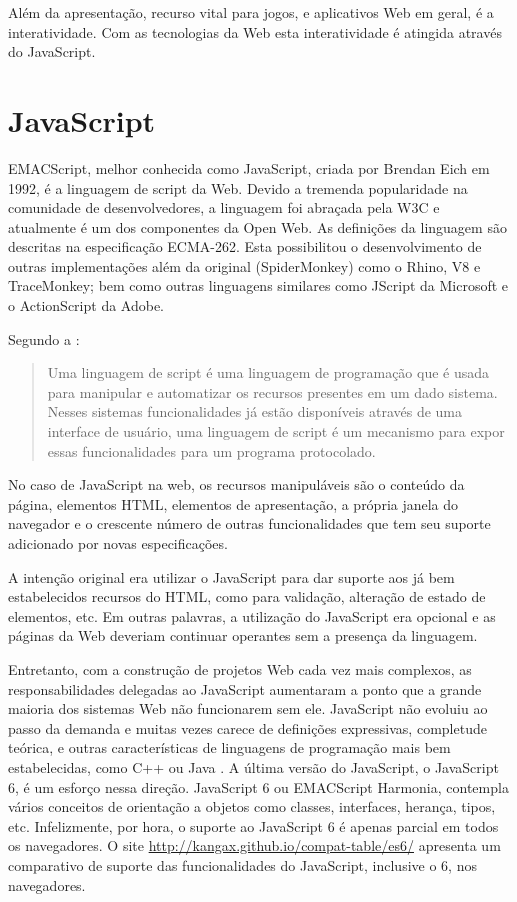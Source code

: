 Além da apresentação, recurso vital para jogos, e aplicativos Web em
geral, é a interatividade. Com as tecnologias da Web esta interatividade
é atingida através do JavaScript.
\section{JavaScript}

EMACScript, melhor conhecida como JavaScript, criada por Brendan
Eich em 1992, é a linguagem de script da Web. Devido a tremenda
popularidade na comunidade de desenvolvedores, a linguagem foi
abraçada pela W3C e atualmente é um dos componentes da Open Web. As
definições da linguagem são descritas na especificação ECMA-262.
Esta possibilitou o desenvolvimento de outras implementações além da
original (SpiderMonkey) como o Rhino, V8 e TraceMonkey; bem como outras
linguagens similares como JScript da Microsoft e o ActionScript da
Adobe.

Segundo a \citet{ecmaSpecificaton}:
\begin{quote}
Uma linguagem de script é uma linguagem de programação que é
usada para manipular e automatizar os recursos presentes em um dado
sistema. Nesses sistemas funcionalidades já estão disponíveis
através de uma interface de usuário, uma linguagem de script é
um mecanismo para expor essas funcionalidades para um programa
protocolado.
\end{quote}

No caso de JavaScript na web, os recursos manipuláveis são o conteúdo
da página, elementos HTML, elementos de apresentação, a própria
janela do navegador e o crescente número de outras funcionalidades que
tem seu suporte adicionado por novas especificações.

A intenção original era utilizar o JavaScript para dar suporte aos já
bem estabelecidos recursos do HTML, como para validação, alteração
de estado de elementos, etc. Em outras palavras, a utilização do
JavaScript era opcional e as páginas da Web deveriam continuar
operantes sem a presença da linguagem.

Entretanto, com a construção de projetos Web cada vez mais
complexos, as responsabilidades delegadas ao JavaScript aumentaram a
ponto que a grande maioria dos sistemas Web não funcionarem sem ele.
JavaScript não evoluiu ao passo da demanda e muitas vezes carece de
definições expressivas, completude teórica, e outras características
de linguagens de programação mais bem estabelecidas, como C++ ou
Java \autocite{crossPlatformMobileGame}. A última versão do JavaScript, o
JavaScript 6, é um esforço nessa direção. JavaScript 6 ou EMACScript
Harmonia, contempla vários conceitos de orientação a objetos como
classes, interfaces, herança, tipos, etc. Infelizmente, por hora, o suporte
ao JavaScript 6 é apenas parcial em todos os navegadores. O site
\url{http://kangax.github.io/compat-table/es6/} apresenta um comparativo de
suporte das funcionalidades do JavaScript, inclusive o 6, nos navegadores.

